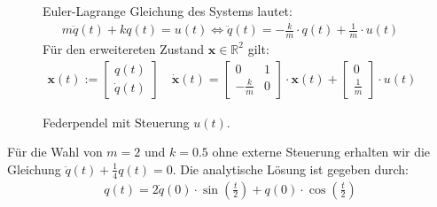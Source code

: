\documentclass[a4paper, 12pt]{scrartcl}
\begin{document}
\begin{figure}[ht]
\begin{minipage}[c]{0.4\textwidth}
\begin{tikzpicture}[scale = 1.5, every node/.style={transform shape}]
        \end{tikzpicture}
    \end{minipage}%
    \hfill
    \begin{minipage}[c]{0.55\textwidth}
        Euler-Lagrange Gleichung des Systems lautet:
        \begin{align*}
            m \ddot{q}(t) + k q(t) = u(t) 
            \Leftrightarrow 
            \ddot{q}(t) = -\frac{k}{m} \cdot q(t) + \frac{1}{m} \cdot u(t)
        \end{align*}
        Für den erweitereten Zustand $\bm{x} \in \mathbb{R}^2$ gilt:
        \begin{align*}
            \bm{x}(t) :=
            \begin{bmatrix}
                q(t) \\
                \dot{q}(t)
            \end{bmatrix}
            \quad
            \bm{\dot{x}}(t) 
            =
            \begin{bmatrix}
                0 & 1 \\
                -\frac{k}{m} & 0  
            \end{bmatrix}
            \cdot 
            \bm{x}(t)
            + 
            \begin{bmatrix}
                0 \\
                \frac{1}{m}
            \end{bmatrix}
            \cdot 
            u(t)
        \end{align*}
    \end{minipage}
    \caption{Federpendel mit Steuerung $u(t)$.}
    \label{fig:federpendel}
\end{figure}


Für die Wahl von $m=2$ und $k=0.5$ ohne externe Steuerung erhalten wir die Gleichung 
$\ddot{q}(t) + \frac{1}{4} q(t) = 0$.
Die analytische Lösung ist gegeben durch:
%
\begin{align*}
    q(t) = 2 \dot{q}(0) \cdot \sin\left( \frac{t}{2} \right) + q(0) \cdot \cos\left(\frac{t}{2} \right)
\end{align*}
\end{document}
